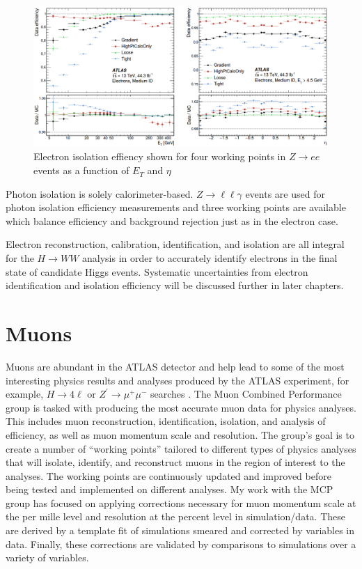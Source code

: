 \begin{figure}[!h]
        \centering
    \includegraphics[width=.65\textwidth]{Pictures/ElectronIsoEff.png}
    \caption{ Electron isolation effiency shown for four working points in $Z\rightarrow ee$ events as a function of $E_T$ and $\eta$ \cite{ElectronPhotonPerformance}}
    \label{fig:ElectronIsoEff}
\end{figure}

Photon isolation is solely calorimeter-based. $Z\rightarrow \ell\ell\gamma$ events are used for photon isolation efficiency measurements and three working points are available which balance efficiency and background rejection just as in the electron case. 

Electron reconstruction, calibration, identification, and isolation are all integral for the $H\rightarrow WW$ analysis in order to accurately identify electrons in the final state of candidate Higgs events. Systematic uncertainties from electron identification and isolation efficiency will be discussed further in later chapters. 

\section{Muons}
Muons are abundant in the ATLAS detector and help lead to some of the most interesting physics results and analyses produced by the ATLAS experiment, for example, $H \rightarrow 4\ell$ or $Z^\prime \rightarrow \mu^+\mu^-$ searches \cite{4l}. The Muon Combined Performance group is tasked with producing the most accurate muon data for physics analyses. This includes muon reconstruction, identification, isolation, and analysis of efficiency, as well as muon momentum scale and resolution. The group's goal is to create a number of ``working points'' tailored to different types of physics analyses that will isolate, identify, and reconstruct muons in the region of interest to the analyses. The working points are continuously updated and improved before being tested and implemented on different analyses. My work with the MCP group has focused on applying corrections necessary for muon momentum scale at the per mille level and resolution at the percent level in simulation/data. These are derived by a template fit of simulations smeared and corrected by variables in data. Finally, these corrections are validated by comparisons to simulations over a variety of variables. 

